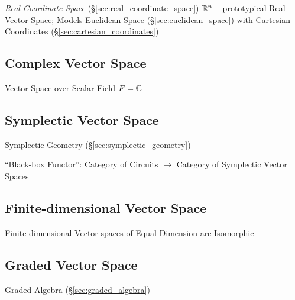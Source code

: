 \fist \emph{Real Coordinate Space} (\S\ref{sec:real_coordinate_space})
$\mathbb{R}^n$ -- prototypical Real Vector Space; Models Euclidean Space
(\S\ref{sec:euclidean_space}) with Cartesian Coordinates
(\S\ref{sec:cartesian_coordinates})



\subsection{Complex Vector Space}\label{sec:complex_vector_space}

Vector Space over Scalar Field $F = \mathbb{C}$



\subsection{Symplectic Vector Space}\label{sec:symplectic_vectorspace}

Symplectic Geometry (\S\ref{sec:symplectic_geometry})

``Black-box Functor'': Category of Circuits $\rightarrow$ Category of
Symplectic Vector Spaces %



\subsection{Finite-dimensional Vector Space}
\label{sec:finite_dimensional_vectorspace}

Finite-dimensional Vector spaces of Equal Dimension are Isomorphic



\subsection{Graded Vector Space}\label{sec:graded_vectorspace}

Graded Algebra (\S\ref{sec:graded_algebra})



